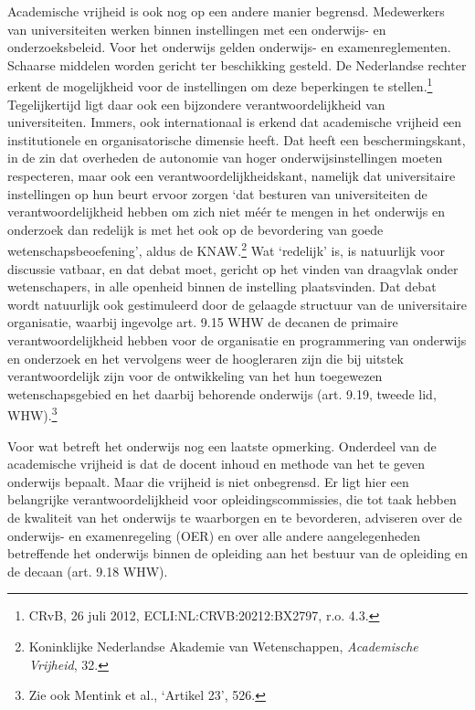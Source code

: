 \documentclass[smallauthor, chapterhaspagenum, nochapterinheader, pagenuminheader,  bigchapnum,medium2, tocpages, garamond, titleinheader]{jote-book}
\begin{document}
	Academische vrijheid is ook nog op een andere manier begrensd. Medewerkers van universiteiten werken binnen instellingen met een onderwijs- en onderzoeksbeleid. Voor het onderwijs gelden onderwijs- en examenreglementen. Schaarse middelen worden gericht ter beschikking gesteld. De Nederlandse rechter erkent de mogelijkheid voor de instellingen om deze beperkingen te stellen.\footnote{CRvB, 26 juli 2012, ECLI:NL:CRVB:20212:BX2797, r.o. 4.3.} Tegelijkertijd ligt daar ook een bijzondere verantwoordelijkheid van universiteiten. Immers, ook internationaal is erkend dat academische vrijheid een institutionele en organisatorische dimensie heeft. Dat heeft een beschermingskant, in de zin dat overheden de autonomie van hoger onderwijsinstellingen moeten respecteren, maar ook een verantwoordelijkheidskant, namelijk dat universitaire instellingen op hun beurt ervoor zorgen ‘dat besturen van universiteiten de verantwoordelijkheid hebben om zich niet méér te mengen in het onderwijs en onderzoek dan redelijk is met het ook op de bevordering van goede wetenschapsbeoefening', aldus de KNAW.\footnote{Koninklijke Nederlandse Akademie van Wetenschappen, \emph{Academische Vrijheid}, 32.} Wat ‘redelijk' is, is natuurlijk voor discussie vatbaar, en dat debat moet, gericht op het vinden van draagvlak onder wetenschapers, in alle openheid binnen de instelling plaatsvinden. Dat debat wordt natuurlijk ook gestimuleerd door de gelaagde structuur van de universitaire organisatie, waarbij ingevolge art. 9.15 WHW de decanen de primaire verantwoordelijkheid hebben voor de organisatie en programmering van onderwijs en onderzoek en het vervolgens weer de hoogleraren zijn die bij uitstek verantwoordelijk zijn voor de ontwikkeling van het hun toegewezen wetenschapsgebied en het daarbij behorende onderwijs (art. 9.19, tweede lid, WHW).\footnote{Zie ook Mentink et al., ‘Artikel 23', 526.}



	Voor wat betreft het onderwijs nog een laatste opmerking. Onderdeel van de academische vrijheid is dat de docent inhoud en methode van het te geven onderwijs bepaalt. Maar die vrijheid is niet onbegrensd. Er ligt hier een belangrijke verantwoordelijkheid voor opleidingscommissies, die tot taak hebben de kwaliteit van het onderwijs te waarborgen en te bevorderen, adviseren over de onderwijs- en examenregeling (OER) en over alle andere aangelegenheden betreffende het onderwijs binnen de opleiding aan het bestuur van de opleiding en de decaan (art. 9.18 WHW).
\end{document}
